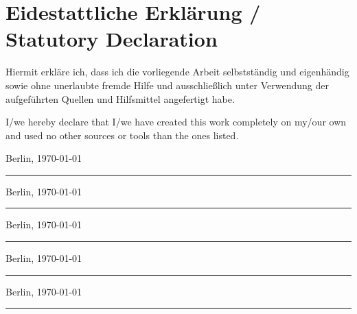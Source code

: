 \chapter*{\LARGE Eidestattliche Erklärung / Statutory Declaration}
Hiermit erkläre ich, dass ich die vorliegende Arbeit selbstständig und eigenhändig sowie ohne unerlaubte fremde Hilfe und ausschließlich unter Verwendung der aufgeführten Quellen und Hilfsmittel angefertigt habe.
\vspace{2em}

\noindent I/we hereby declare that I/we have created this work completely on my/our own and used no other sources or tools than the ones listed.

\vspace{30 mm}
\begin{flushright}


Berlin, \today \hspace{15 mm} 
\rule{90mm}{1pt}\newline\newline
Berlin, \today \hspace{15 mm} 
\rule{90mm}{1pt}\newline\newline
Berlin, \today \hspace{15 mm} 
\rule{90mm}{1pt}\newline\newline
Berlin, \today \hspace{15 mm} 
\rule{90mm}{1pt}\newline\newline
Berlin, \today \hspace{15 mm} 
\rule{90mm}{1pt}\newline\newline
\end{flushright}
